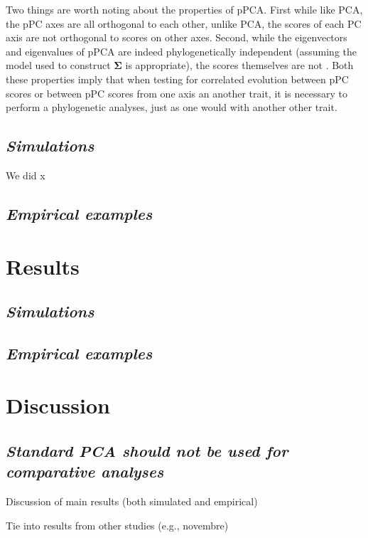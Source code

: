 \documentclass[a4paper,12pt]{article}
\begin{document}
Two things are worth noting about the properties of pPCA. First while like PCA, the pPC axes are all orthogonal to each other, unlike PCA, the scores of each PC axis are not orthogonal to scores on other axes. Second, while the eigenvectors and eigenvalues of pPCA are indeed phylogenetically independent (assuming the model used to construct $\mathbf{\Sigma}$ is appropriate), the scores themselves are not \citep{Revell2008, Polly2013}. Both these properties imply that when testing for correlated evolution between pPC scores or between pPC scores from one axis an another trait, it is necessary to perform a phylogenetic analyses, just as one would with another other trait.  


\subsection{\emph{Simulations}}

We did x

\subsection{\emph{Empirical examples}}

\section{Results}

\subsection{\emph{Simulations}}

\subsection{\emph{Empirical examples}}

\section{Discussion}
\subsection{\emph{Standard PCA should not be used for comparative analyses}} 

Discussion of main results (both simulated and empirical)

Tie into results from other studies (e.g., novembre)
\end{document}
